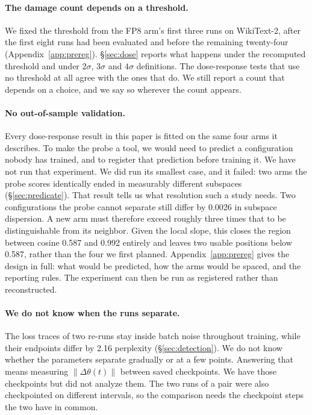\documentclass[11pt,letterpaper]{article}
\begin{document}
\paragraph{The damage count depends on a threshold.} We fixed the threshold from the FP8 arm's first three runs on WikiText-2, after the first eight runs had been evaluated and before the remaining twenty-four (Appendix~\ref{app:prereg}). \S\ref{sec:dose} reports what happens under the recomputed threshold and under $2\sigma$, $3\sigma$ and $4\sigma$ definitions. The dose-response tests that use no threshold at all agree with the ones that do. We still report a count that depends on a choice, and we say so wherever the count appears.

\paragraph{No out-of-sample validation.} Every dose-response result in this paper is fitted on the same four arms it describes. To make the probe a tool, we would need to predict a configuration nobody has trained, and to register that prediction before training it. We have not run that experiment. We did run its smallest case, and it failed: two arms the probe scores identically ended in measurably different subspaces (\S\ref{sec:predicate}). That result tells us what resolution such a study needs. Two configurations the probe cannot separate still differ by 0.0026 in subspace dispersion. A new arm must therefore exceed roughly three times that to be distinguishable from its neighbor. Given the local slope, this closes the region between cosine 0.587 and 0.992 entirely and leaves two usable positions below 0.587, rather than the four we first planned. Appendix~\ref{app:prereg} gives the design in full: what would be predicted, how the arms would be spaced, and the reporting rules. The experiment can then be run as registered rather than reconstructed.

\paragraph{We do not know when the runs separate.} The loss traces of two re-runs stay inside batch noise throughout training, while their endpoints differ by 2.16 perplexity (\S\ref{sec:detection}). We do not know whether the parameters separate gradually or at a few points. Answering that means measuring $\|\Delta\theta(t)\|$ between saved checkpoints. We have those checkpoints but did not analyze them. The two runs of a pair were also checkpointed on different intervals, so the comparison needs the checkpoint steps the two have in common.
\end{document}
